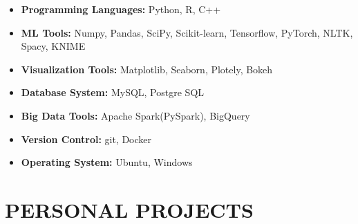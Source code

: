 \documentclass[11pt,a4paper,sans]{moderncv}
\begin{document}
\begin{itemize}

\item \textbf{Programming Languages:} Python, R, C++

\vspace{1pt}

\item \textbf{ML Tools:} Numpy, Pandas, SciPy, Scikit-learn, Tensorflow, PyTorch, NLTK, Spacy, KNIME

\vspace{1pt}

\item \textbf{Visualization Tools:} Matplotlib, Seaborn, Plotely, Bokeh

\vspace{1pt}

\item \textbf{Database System:} MySQL, Postgre SQL

\vspace{1pt}

\item \textbf{Big Data Tools:} Apache Spark(PySpark), BigQuery

\vspace{1pt}

\item \textbf{Version Control:} git, Docker

\vspace{1pt}

\item \textbf{Operating System:} Ubuntu, Windows

\end{itemize}

\section{PERSONAL PROJECTS}

\vspace{3pt}
\end{document}
